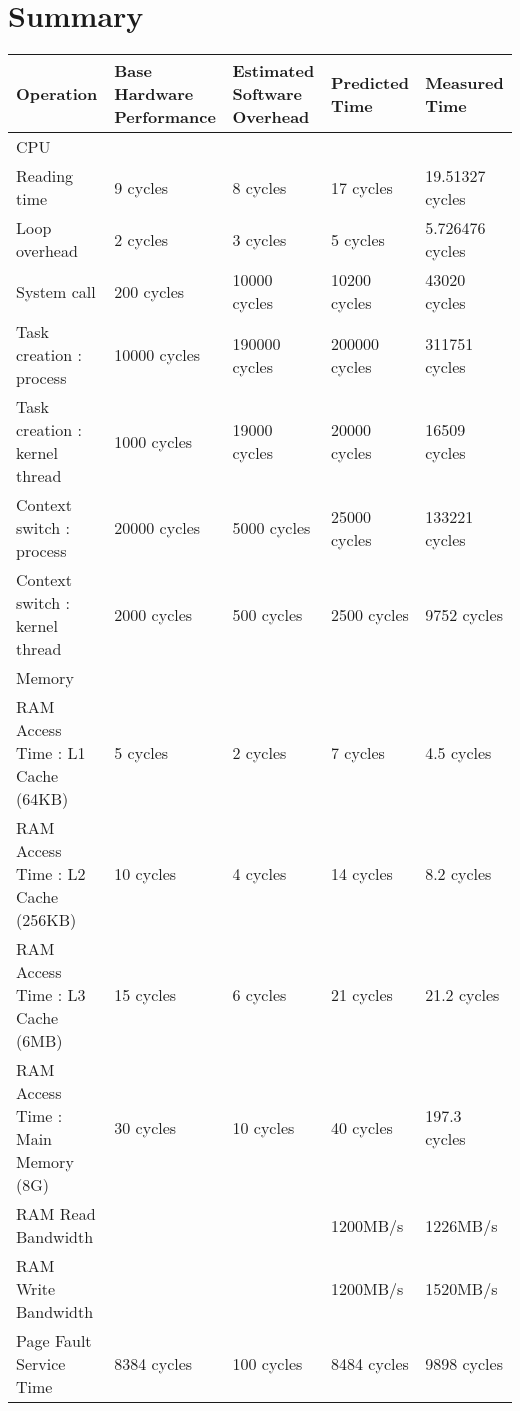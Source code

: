 \chapter{Summary}

\small
\begin{center}
\begin{tabular}{| p{4cm} | p{2.5cm} | p{2.5cm} | p{2.5cm} | p{2.5cm} |}
\hline
Operation  & Base Hardware Performance  & Estimated Software Overhead  & Predicted Time  & Measured Time   \\
\hline 
CPU & & & & \\
\hline
Reading time & 9 cycles & 8 cycles & 17 cycles & 19.51327 cycles \\
Loop overhead & 2 cycles& 3 cycles& 5 cycles& 5.726476 cycles\\
System call & 200 cycles& 10000 cycles& 10200 cycles& 43020 cycles \\
Task creation : process & 10000 cycles& 190000 cycles& 200000 cycles& 311751 cycles \\
Task creation : kernel thread    & 1000 cycles& 19000 cycles& 20000 cycles& 16509 cycles\\
Context switch : process & 20000 cycles& 5000 cycles& 25000 cycles& 133221  cycles\\
Context switch : kernel thread    & 2000 cycles& 500 cycles& 2500 cycles& 9752 cycles\\
\hline 
Memory & & & & \\
\hline
RAM Access Time : L1 Cache (64KB) &   5 cycles  & 2 cycles & 7 cycles &  4.5 cycles \\
RAM Access Time : L2 Cache (256KB) & 10 cycles & 4 cycles & 14 cycles &  8.2 cycles\\
RAM Access Time : L3 Cache (6MB) & 15 cycles & 6 cycles & 21 cycles  & 21.2 cycles\\
RAM Access Time : Main Memory (8G) & 30 cycles & 10 cycles & 40 cycles & 197.3 cycles\\
RAM Read Bandwidth & & & 1200MB/s & 1226MB/s \\
RAM Write Bandwidth & & & 1200MB/s & 1520MB/s \\
Page Fault Service Time & 8384 cycles& 100 cycles& 8484 cycles& 9898 cycles\\
\end{tabular}
\end{center}



